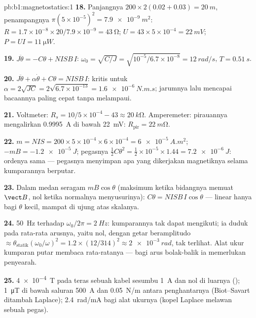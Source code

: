 \begin{solution}{pb:b1:magnetostatics:1}
\textbf{18.} Panjangnya $200 \times 2(0.02 + 0.03) = \qty{20}{m}$, penampangnya $\pi(5 \times
10^{-5})^2 = \qty{7.9e-9}{m^2}$: $R = 1.7 \times 10^{-8} \times 20/7.9 \times 10^{-9} =
\qty{43}{\ohm}$; $U = 43 \times 5 \times 10^{-4} = \qty{22}{mV}$; $P = UI = \qty{11}{\micro W}$.

\textbf{19.} $J\ddot\theta = -C\theta + NISB\,I$: $\omega_0 = \sqrt{C/J} = \sqrt{10^{-5}/6.7
\times 10^{-8}} = \qty{12}{rad/s}$, $T = \qty{0.51}{s}$.

\textbf{20.} $J\ddot\theta + \alpha\dot\theta + C\theta = NISB\,I$: kritis untuk
$\alpha = 2\sqrt{JC} = 2\sqrt{6.7 \times 10^{-13}} = \qty{1.6e-6}{N.m.s}$; jarumnya
lalu mencapai bacaannya paling cepat tanpa melampaui.

\textbf{21.} Voltmeter: $R_s = 10/5 \times 10^{-4} - 43 \approx \qty{20}{k\ohm}$.
Amperemeter: pirauannya mengalirkan \qty{0.9995}{A} di bawah \qty{22}{mV}: $R_{\text{pir}} =
\qty{22}{m\ohm}$.

\textbf{22.} $m = NIS = 200 \times 5 \times 10^{-4} \times 6 \times 10^{-4} = \qty{6e-5}{A.m^2}$;
$-mB = \qty{-1.2e-5}{J}$; pegasnya $\tfrac12C\theta^2 = \tfrac12 \times 10^{-5} \times 1.44 =
\qty{7.2e-6}{J}$: ordenya sama --- pegasnya menyimpan apa yang dikerjakan  magnetiknya selama kumparannya berputar.

\textbf{23.} Dalam medan seragam  $mB\cos\theta$ (maksimum ketika
bidangnya memuat $\vect B$, nol ketika normalnya menyusurinya): $C\theta =
NISB\,I\cos\theta$ --- linear hanya bagi $\theta$ kecil, mampat di
ujung atas skalanya.

\textbf{24.} \qty{50}{Hz} terhadap $\omega_0/2\pi = \qty{2}{Hz}$: kumparannya tak dapat
mengikuti; ia duduk pada rata-rata arusnya, yaitu nol, dengan getar
beramplitudo $\approx \theta_{\text{statik}}(\omega_0/\omega)^2 = 1.2 \times (12/314)^2 \approx
\qty{2e-3}{rad}$, tak terlihat. Alat ukur kumparan putar membaca rata-ratanya --- bagi
arus bolak-balik ia memerlukan penyearah.

\textbf{25.} \qty{4e-4}{T} pada teras sebuah kabel sesumbu \qty{1}{A} dan nol di luarnya
(); \qty{1}{\micro T} di bawah saluran \qty{500}{A} dan \qty{0.05}{N/m}
antara penghantarnya (Biot--Savart ditambah Laplace); \qty{2.4}{rad/mA} bagi
alat ukurnya (kopel Laplace melawan sebuah pegas).
\end{solution}

